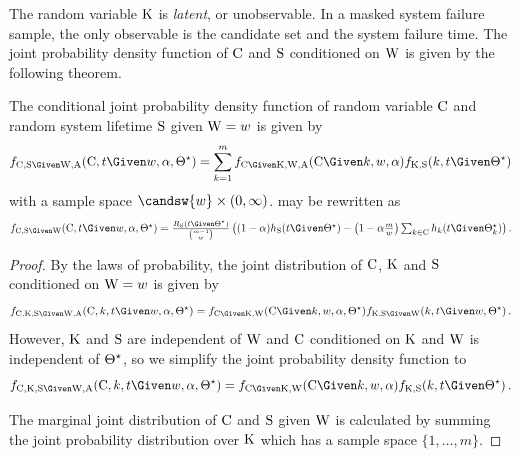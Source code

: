 \documentclass[../main.tex]{subfiles}
\begin{document}
The random variable $\mathrm{K}$ is \emph{latent}, or unobservable.
In a masked system failure sample, the only observable is the candidate set and the system failure time.
The joint probability density function of $\mathrm{C}$ and $\mathrm{S}$ conditioned on $\mathrm{W}$ is given by the following theorem.
\begin{theorem}
The conditional joint probability density function of random variable $\mathrm{C}$ and random system lifetime $\mathrm{S}$ given $\mathrm{W} = w$ is given by
\begin{equation}
\label{eq:joint_alpha}
\pdf_{\rvcand,\sv \Given \RV{W}, \RV{A}}(\cand,t \Given w, \alpha, \tparam\sysparam) =
	\sum_{k=1}^{m} \pdf_{\rvcand \Given \RV{K}, \RV{W}, \RV{A}}(\cand \Given k, w, \alpha) \pdf_{\RV{K},\sv}(k,t \Given \tparam\sysparam)
\end{equation}
with a sample space $\candsw{w} \times (0,\infty)$.
 may be rewritten as
\begin{equation}
\label{eq:joint_alpha_2}
\mathsmaller{\pdf_{\rvcand,\sv \Given \RV{W}}(\cand,t \Given w, \alpha, \tparam\sysparam) =
\frac{\srv_{\sv}(t \Given \tparam\sysparam)}{\binom{m-1}{w}}
\left(
	(1-\alpha) \haz_{\sv}(t \Given \tparam\sysparam) - \left(1-\alpha \frac{m}{w}\right) \sum_{k \in \cand} \haz_k(t \Given \tparam\sysparam_k)
\right)}\,.
\end{equation}
\end{theorem}
\begin{proof}
By the laws of probability, the joint distribution of $\mathrm{C}$, $\mathrm{K}$ and $\mathrm{S}$ conditioned on $\mathrm{W} = w$ is given by
\begin{equation}
	\pdf_{\rvcand,\RV{K},\sv \Given \RV{W}, \RV{A}}(\cand,k,t \Given w, \alpha, \tparam\sysparam) = \pdf_{\rvcand \Given \RV{K}, \RV{W}}(\cand \Given k, w, \alpha, \tparam\sysparam) \pdf_{\RV{K},\sv \Given \RV{W}}(k,t \Given w,\tparam\sysparam)\,.
\end{equation}
However, $\mathrm{K}$ and $\mathrm{S}$ are independent of $\mathrm{W}$ and $\mathrm{C}$ conditioned on $\mathrm{K}$ and $\mathrm{W}$ is independent of ${\Theta}^{\star}$, so we simplify the joint probability density function to
\begin{equation}
\pdf_{\rvcand,\RV{K},\sv \Given \RV{W}, \RV{A}}(\cand,k,t \Given w, \alpha, \tparam\sysparam) = \pdf_{\rvcand \Given \RV{K}, \RV{W}}(\cand \Given k, w, \alpha) \pdf_{\RV{K},\sv}(k,t \Given \tparam\sysparam)\,.
\end{equation}

The marginal joint distribution of $\mathrm{C}$ and $\mathrm{S}$ given $\mathrm{W}$ is calculated by summing the joint probability distribution over $\mathrm{K}$ which has a sample space $\{1,\ldots,m\}$.
\end{proof}
\end{document}
